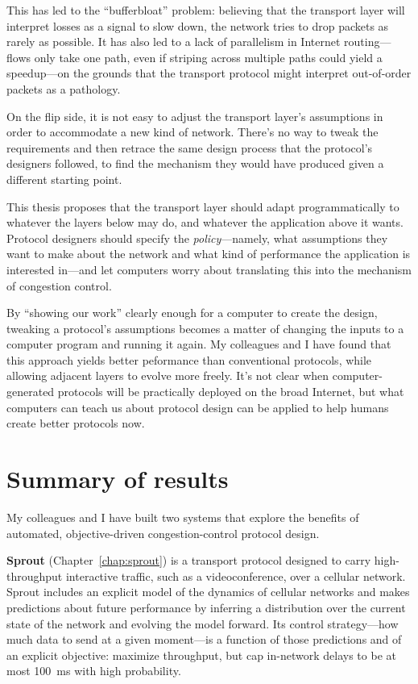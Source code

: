 This has led to the ``bufferbloat''\cite{bufferbloat} problem:
believing that the transport layer will interpret losses as a signal
to slow down, the network tries to drop packets as rarely as
possible. It has also led to a lack of parallelism in Internet
routing---flows only take one path, even if striping across
multiple paths could yield a speedup---on the grounds that the
transport protocol might interpret out-of-order packets as a
pathology.

On the flip side, it is not easy to adjust the transport
layer's assumptions in order to accommodate a new kind of
network. There's no way to tweak the requirements and then retrace the
same design process that the protocol's designers followed, to find the
mechanism they would have produced given a different starting point.


This thesis proposes that the transport layer should adapt
programmatically to whatever the layers below may do, and whatever the
application above it wants. Protocol designers should specify the
\emph{policy}---namely, what assumptions they want to make about the
network and what kind of performance the application is interested
in---and let computers worry about translating this into the mechanism
of congestion control.

By ``showing our work'' clearly enough for a computer to create the
design, tweaking a protocol's assumptions becomes a matter of changing
the inputs to a computer program and running it again. My colleagues
and I have found that this approach yields better peformance than
conventional protocols, while allowing adjacent layers to evolve more
freely. It's not clear when computer-generated protocols will be
practically deployed on the broad Internet, but what computers can
teach us about protocol design can be applied to help humans create
better protocols now.

\section{Summary of results}

My colleagues and I have built two systems that explore the benefits
of automated, objective-driven congestion-control protocol design.

\textbf{Sprout} (Chapter~\ref{chap:sprout}) is a transport protocol
designed to carry high-throughput interactive traffic, such as a
videoconference, over a cellular network. Sprout includes an explicit
model of the dynamics of cellular networks and makes predictions about
future performance by inferring a distribution over the current state
of the network and evolving the model forward. Its control
strategy---how much data to send at a given moment---is a function of
those predictions and of an explicit objective: maximize throughput,
but cap in-network delays to be at most 100~ms with high
probability.

